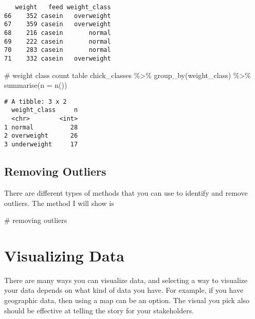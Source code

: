\documentclass[
  letterpaper,
  DIV=11,
  numbers=noendperiod]{scrreprt}
\newenvironment{Shaded}{\begin{snugshade}}{\end{snugshade}}
\newcommand{\AttributeTok}[1]{\textcolor[rgb]{0.40,0.45,0.13}{#1}}
\newcommand{\CommentTok}[1]{\textcolor[rgb]{0.37,0.37,0.37}{#1}}
\newcommand{\FunctionTok}[1]{\textcolor[rgb]{0.28,0.35,0.67}{#1}}
\newcommand{\NormalTok}[1]{\textcolor[rgb]{0.00,0.23,0.31}{#1}}
\newcommand{\SpecialCharTok}[1]{\textcolor[rgb]{0.37,0.37,0.37}{#1}}
\begin{document}
\begin{verbatim}
   weight   feed weight_class
66    352 casein   overweight
67    359 casein   overweight
68    216 casein       normal
69    222 casein       normal
70    283 casein       normal
71    332 casein   overweight
\end{verbatim}

\begin{Shaded}
\begin{Highlighting}[]
\CommentTok{\# weight class count table }
\NormalTok{chick\_classes }\SpecialCharTok{\%\textgreater{}\%} 
  \FunctionTok{group\_by}\NormalTok{(weight\_class) }\SpecialCharTok{\%\textgreater{}\%}
  \FunctionTok{summarise}\NormalTok{(}\AttributeTok{n =} \FunctionTok{n}\NormalTok{())}
\end{Highlighting}
\end{Shaded}

\begin{verbatim}
# A tibble: 3 x 2
  weight_class     n
  <chr>        <int>
1 normal          28
2 overweight      26
3 underweight     17
\end{verbatim}

\hypertarget{removing-outliers}{%
\section{Removing Outliers}\label{removing-outliers}}

There are different types of methods that you can use to identify and
remove outliers. The method I will show is

\begin{Shaded}
\begin{Highlighting}[]
\CommentTok{\# removing outliers}
\end{Highlighting}
\end{Shaded}


\hypertarget{visualizing-data}{%
\chapter{Visualizing Data}\label{visualizing-data}}

There are many ways you can visualize data, and selecting a way to
visualize your data depends on what kind of data you have. For example,
if you have geographic data, then using a map can be an option. The
visual you pick also should be effective at telling the story for your
stakeholders.
\end{document}
